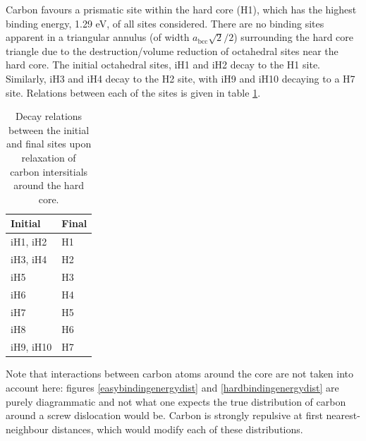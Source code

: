 \documentclass[a4paper,11pt]{article}
\begin{document}
Carbon favours a prismatic site within the hard core (H1), which has the highest
binding energy, 1.29 eV, of all sites considered. There are no binding sites apparent in a triangular
annulus (of width \(a_{\text{bcc}}\sqrt{2}/2\)) surrounding the hard core triangle due to the
destruction/volume reduction of octahedral sites near the hard core. The initial octahedral
sites, iH1 and iH2 decay to the H1 site. Similarly, iH3 and iH4 decay to the H2 site, with iH9
and iH10 decaying to a H7 site. Relations between each of the sites is given in table
\ref{decayrelations}.


\begin{table}[htbp]
\caption{Decay relations between the initial and final sites upon relaxation of carbon intersitials around the hard core. \label{decayrelations}}
\centering
\begin{tabular}{ll}
Initial & Final\\
\hline
iH1, iH2 & H1\\
iH3, iH4 & H2\\
iH5 & H3\\
iH6 & H4\\
iH7 & H5\\
iH8 & H6\\
iH9, iH10 & H7\\
\end{tabular}
\end{table}


Note that interactions between carbon atoms around the core are not taken into account here:
figures \ref{easybindingenergydist} and \ref{hardbindingenergydist} are purely diagrammatic and not
what one expects the true distribution of carbon around a screw dislocation would be. Carbon is strongly
repulsive at first nearest-neighbour distances, which would modify each of these
distributions. 
\end{document}
